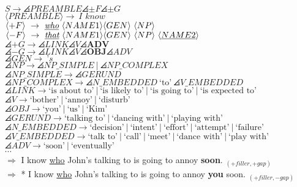 \\
\\
$S \rightarrow \angles{PREAMBLE} \angles{\pm F} \angles{\pm G} $
\\
$\langle PREAMBLE \rangle \rightarrow \ \textit{I know}$
\\
$\angles{+F} \rightarrow \ \textit{\underline{who}}\  \langle NAME1 \rangle \angles{GEN} \angles{NP} $
\\
$\angles{-F} \rightarrow \ \textit{\underline{that}}\  \langle NAME1 \rangle \angles{GEN} \angles{NP} \angles{\underline{NAME2}} $
\\
$\angles{+G} \rightarrow \angles{LINK}\angles{V} \angles{\textbf{ADV}}$
\\
$\angles{-G} \rightarrow \angles{LINK}\angles{V} \angles{\textbf{OBJ}}\angles{ADV} $
\\
$\angles{GEN} \rightarrow \ \textit{'s} $
\\
$\angles{NP} \rightarrow \angles{NP\_SIMPLE}\ |\ \angles{NP\_COMPLEX}$
 \\ 
$\angles{NP\_SIMPLE} \rightarrow \angles{GERUND}$
 \\ 
$\angles{NP\_COMPLEX} \rightarrow \angles{N\_EMBEDDED}\ \text{`to'}\ \angles{V\_EMBEDDED}$
 \\ 
$\angles{LINK} \rightarrow \text{`is about to'}\ |\ \text{`is likely to'}\ |\ \text{`is going to'}\ |\ \text{`is expected to'}$
 \\ 
$\angles{V} \rightarrow \text{`bother'}\ |\ \text{`annoy'}\ |\ \text{`disturb'}$
 \\ 
 $\angles{OBJ} \rightarrow \text{`you'}\ |\ \text{`us'}\ |\ \text{`Kim'}$
\\
$\angles{GERUND} \rightarrow \text{`talking to'}\ |\ \text{`dancing with'}\ |\ \text{`playing with'}$
 \\ 
$\angles{N\_EMBEDDED} \rightarrow \text{`decision'}\ |\ \text{`intent'}\ |\ \text{`effort'}\ |\ \text{`attempt'}\ |\ \text{`failure'}$
 \\ 
$\angles{V\_EMBEDDED} \rightarrow \text{`talk to'}\ |\ \text{`call'}\ |\ \text{`meet'}\ |\ \text{`dance with'}\ |\ \text{`play with'}$
 \\ 
$\angles{ADV} \rightarrow \text{`soon'}\ |\ \text{`eventually'}$
\\
$\cdots$
\\

$\Rightarrow$ I know \underline{who} John's talking to is going to annoy \textbf{soon}. $_{(+filler, +gap)}$
\\
$\Rightarrow$ * I know \underline{who} John's talking to is going to annoy \textbf{you} soon. $_{(+filler, -gap)}$
\\
\\
\hline
\hline
